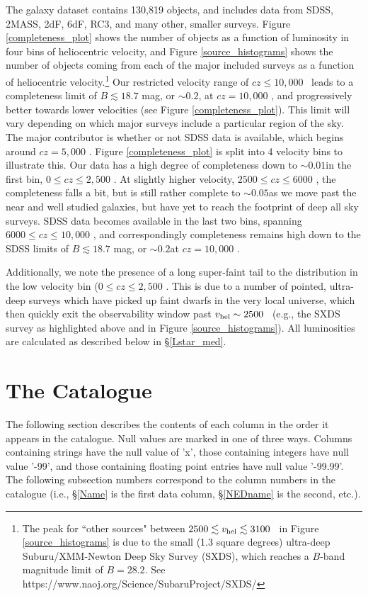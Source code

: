 The galaxy dataset contains 130,819  objects, and includes data from SDSS, 2MASS, 2dF, 6dF, RC3, and many other, smaller surveys. Figure \ref{completeness_plot} shows the number of objects as a function of luminosity in four bins of heliocentric velocity, and Figure \ref{source_histograms} shows the number of objects coming from each of the major included surveys as a function of heliocentric velocity.\footnote{The peak for ``other sources" between $2500 \lesssim v_{\rm hel} \lesssim 3100$ \kms~in Figure \ref{source_histograms} is due to the small (1.3 square degrees) ultra-deep Suburu/XMM-Newton Deep Sky Survey (SXDS), which reaches a $B$-band magnitude limit of $B=28.2$. See https://www.naoj.org/Science/SubaruProject/SXDS/} Our restricted velocity range of $cz \leq 10,000$ \kms~leads to a completeness limit of $B \lesssim 18.7$ mag, or $\sim0.2$\Lstar, at $cz = 10,000$ \kms, and progressively better towards lower velocities (see Figure \ref{completeness_plot}). This limit will vary depending on which major surveys include a particular region of the sky. The major contributor is whether or not SDSS data is available, which begins around $cz = 5,000$ \kms. Figure \ref{completeness_plot} is split into 4 velocity bins to illustrate this. Our data has a high degree of completeness down to $\sim0.01$\Lstar in the first bin, $0 \leq cz \leq 2,500$ \kms. At slightly higher velocity, $2500 \leq cz \leq 6000$ \kms, the completeness falls a bit, but is still rather complete to $\sim0.05$\Lstar as we move past the near and well studied galaxies, but have yet to reach the footprint of deep all sky surveys. SDSS data becomes available in the last two bins, spanning $6000 \leq cz \leq 10,000$ \kms, and correspondingly completeness remains high down to the SDSS limits of $B \lesssim 18.7$ mag, or $\sim0.2$\Lstar at $cz = 10,000$ \kms. 


Additionally, we note the presence of a long super-faint tail to the distribution in the low velocity bin ($0 \leq cz \leq 2,500$ \kms. This is due to a number of pointed, ultra-deep surveys which have picked up faint dwarfs in the very local universe, which then quickly exit the observability window past $v_{\rm hel} \sim 2500$ \kms~(e.g., the SXDS survey as highlighted above and in Figure \ref{source_histograms}). All luminosities are calculated as described below in \S \ref{Lstar_med}.


\section{The Catalogue}
The following section describes the contents of each column in the order it appears in the catalogue. Null values are marked in one of three ways. Columns containing strings have the null value of 'x', those containing integers have null value '-99', and those containing floating point entries have null value '-99.99'. The following subsection numbers correspond to the column numbers in the catalogue (i.e., \S \ref{Name} is the first data column, \S \ref{NEDname} is the second, etc.).

